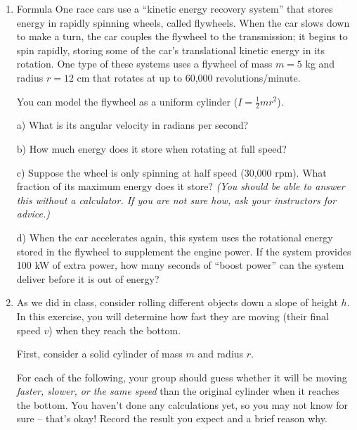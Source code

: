 \documentclass[12pt]{article}
\begin{document}
\Large
\centerline{}
\normalsize
\centerline{}


\begin{enumerate}

\item {Formula One race cars use a ``kinetic energy recovery system'' that stores energy in rapidly spinning wheels, called flywheels. When the car slows down to make a turn, the car couples the flywheel to the transmission; it begins to spin rapidly, storing some of the car's translational kinetic energy in its rotation. One type of these systems uses a flywheel of mass $m=5$ kg and radius $r=12$ cm that rotates at up to 60,000 revolutions/minute.

You can model the flywheel as a uniform cylinder ($I=\frac{1}{2}mr^2$).


a) What is its angular velocity in radians per second?

\vspace{2in}

b) How much energy does it store when rotating at full speed?

\vspace{2in}

c) Suppose the wheel is only spinning at half speed (30,000 rpm). What fraction of its maximum energy does it store? \textit{(You should be able to answer this without a calculator. If you are not sure how, ask your instructors for advice.)}

\vspace{0.5in}

d) When the car accelerates again, this system uses the rotational energy stored in the flywheel to supplement the engine power. If the system provides 100 kW of extra power, how many seconds of ``boost power'' can the system deliver before it is out of energy?

}

\newpage

\item {

As we did in class, consider rolling different objects down a slope of height $h$. In this exercise, you will determine how fast they are moving (their final speed $v$) when they reach the bottom.

First, consider a solid cylinder of mass $m$ and radius $r$. 

For each of the following, your group should guess whether it will be moving \textit{faster, slower, or the same speed} than the original cylinder when it reaches the bottom. You haven't done any calculations yet, so you may not know for sure -- that's okay! Record the result you expect and a brief reason why.

}
\end{enumerate}
\end{document}
